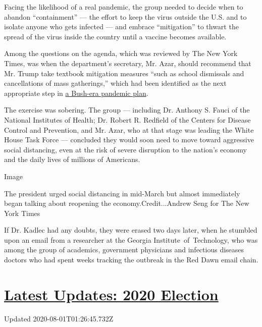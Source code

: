 Facing the likelihood of a real pandemic, the group needed to decide
when to abandon ``containment'' --- the effort to keep the virus outside
the U.S. and to isolate anyone who gets infected --- and embrace
``mitigation'' to thwart the spread of the virus inside the country
until a vaccine becomes available.

Among the questions on the agenda, which was reviewed by The New York
Times, was when the department's secretary, Mr. Azar, should recommend
that Mr. Trump take textbook mitigation measures ``such as school
dismissals and cancellations of mass gatherings,'' which had been
identified as the next appropriate step in
\href{https://www.cdc.gov/flu/pandemic-resources/pdf/community_mitigation-sm.pdf}{a
Bush-era pandemic plan}.

The exercise was sobering. The group --- including Dr. Anthony S. Fauci
of the National Institutes of Health; Dr. Robert R. Redfield of the
Centers for Disease Control and Prevention, and Mr. Azar, who at that
stage was leading the White House Task Force --- concluded they would
soon need to move toward aggressive social distancing, even at the risk
of severe disruption to the nation's economy and the daily lives of
millions of Americans.

Image

The president urged social distancing in mid-March but almost
immediately began talking about reopening the economy.Credit...Andrew
Seng for The New York Times

If Dr. Kadlec had any doubts, they were erased two days later, when he
stumbled upon an email from a researcher at the Georgia
Institute~of~Technology, who was among the group of academics,
government physicians and infectious diseases doctors who had spent
weeks tracking the outbreak in the Red Dawn email chain.

\hypertarget{latest-updates-2020-election}{%
\section{\texorpdfstring{\href{https://www.nytimes.com/2020/07/31/us/elections/biden-vs-trump.html?action=click\&pgtype=Article\&state=default\&region=MAIN_CONTENT_1\&context=storylines_live_updates}{Latest
Updates: 2020
Election}}{Latest Updates: 2020 Election}}\label{latest-updates-2020-election}}

Updated 2020-08-01T01:26:45.732Z

